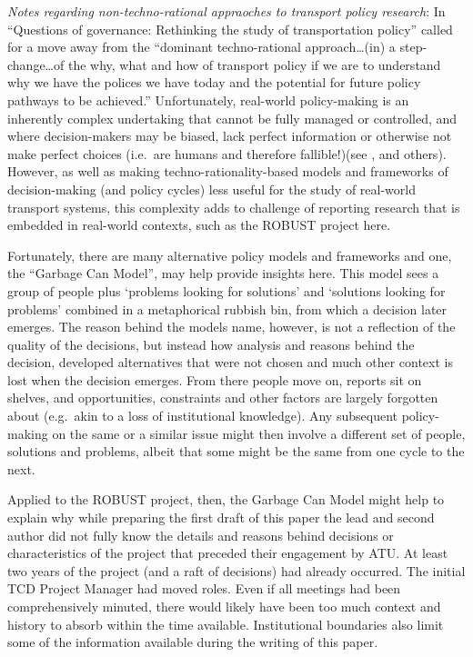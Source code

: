 \documentclass[preprint, 3p,
authoryear]{elsarticle} %
\begin{document}
\emph{Notes regarding non-techno-rational appraoches to transport policy
research}: In ``Questions of governance: Rethinking the study of
transportation policy'' \citet{Marsden:2017aa} called for a move away
from the ``dominant techno-rational approach\ldots(in) a
step-change\ldots of the why, what and how of transport policy if we are
to understand why we have the polices we have today and the potential
for future policy pathways to be achieved.'' Unfortunately, real-world
policy-making is an inherently complex undertaking that cannot be fully
managed or controlled, and where decision-makers may be biased, lack
perfect information or otherwise not make perfect choices (i.e.~are
humans and therefore fallible!)(see \citet{Parsons:1995aa},
\citet{Das:1999aa} and others). However, as well as making
techno-rationality-based models and frameworks of decision-making (and
policy cycles) less useful for the study of real-world transport
systems, this complexity adds to challenge of reporting research that is
embedded in real-world contexts, such as the ROBUST project here.

Fortunately, there are many alternative policy models and frameworks and
one, the ``Garbage Can Model'', may help provide insights here. This
model sees a group of people plus `problems looking for solutions' and
`solutions looking for problems' combined in a metaphorical rubbish bin,
from which a decision later emerges. The reason behind the models name,
however, is not a reflection of the quality of the decisions, but
instead how analysis and reasons behind the decision, developed
alternatives that were not chosen and much other context is lost when
the decision emerges. From there people move on, reports sit on shelves,
and opportunities, constraints and other factors are largely forgotten
about (e.g.~akin to a loss of institutional knowledge). Any subsequent
policy-making on the same or a similar issue might then involve a
different set of people, solutions and problems, albeit that some might
be the same from one cycle to the next.

Applied to the ROBUST project, then, the Garbage Can Model might help to
explain why while preparing the first draft of this paper the lead and
second author did not fully know the details and reasons behind
decisions or characteristics of the project that preceded their
engagement by ATU. At least two years of the project (and a raft of
decisions) had already occurred. The initial TCD Project Manager had
moved roles. Even if all meetings had been comprehensively minuted,
there would likely have been too much context and history to absorb
within the time available. Institutional boundaries also limit some of
the information available during the writing of this paper.
\end{document}
